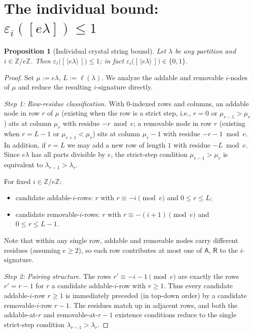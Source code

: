 \documentclass[11pt]{article}
\newtheorem{proposition}[theorem]{Proposition}
\theoremstyle{definition}
\newcommand{\ZZ}{\mathbb{Z}}
\newcommand{\eps}{\varepsilon}
\newcommand{\Aa}{{\mathsf A}}
\newcommand{\Rr}{{\mathsf R}}
\begin{document}
\section{The individual bound: $\eps_i([e\lambda]) \le 1$}\label{sec:individual}

\begin{proposition}[Individual crystal string bound]\label{prop:individual}
Let $\lambda$ be any partition and $i \in \ZZ/e\ZZ$. Then
$\eps_i\bigl([\,|e\lambda\rangle\,]\bigr) \le 1$; in fact
$\eps_i\bigl([\,|e\lambda\rangle\,]\bigr) \in \{0, 1\}$.
\end{proposition}

\begin{proof}
Set $\mu := e\lambda$, $L := \ell(\lambda)$. We analyze the addable and
removable $i$-nodes of $\mu$ and reduce the resulting $i$-signature
directly.

\medskip
\emph{Step 1: Row-residue classification.} With $0$-indexed rows and
columns, an addable node in row $r$ of $\mu$ (existing when the row is a
strict step, i.e., $r = 0$ or $\mu_{r-1} > \mu_r$) sits at column $\mu_r$
with residue $-r \bmod e$; a removable node in row $r$ (existing when
$r = L - 1$ or $\mu_{r+1} < \mu_r$) sits at column $\mu_r - 1$ with residue
$-r - 1 \bmod e$. In addition, if $r = L$ we may add a new row of length
$1$ with residue $-L \bmod e$. Since $e\lambda$ has all parts divisible by
$e$, the strict-step condition $\mu_{r-1} > \mu_r$ is equivalent to
$\lambda_{r-1} > \lambda_r$.

For fixed $i \in \ZZ/e\ZZ$:
\begin{itemize}
  \item candidate addable-$i$-rows: $r$ with $r \equiv -i \pmod e$ and $0 \le r \le L$;
  \item candidate removable-$i$-rows: $r$ with $r \equiv -(i+1) \pmod e$ and $0 \le r \le L - 1$.
\end{itemize}
Note that within any single row, addable and removable nodes carry
different residues (assuming $e \ge 2$), so each row contributes at most
one of $\Aa$, $\Rr$ to the $i$-signature.

\medskip
\emph{Step 2: Pairing structure.} The rows $r' \equiv -i - 1 \pmod e$ are
exactly the rows $r' = r - 1$ for $r$ a candidate addable-$i$-row with
$r \ge 1$. Thus every candidate addable-$i$-row $r \ge 1$ is immediately
preceded (in top-down order) by a candidate removable-$i$-row $r - 1$.
The residues match up in adjacent rows, and both the addable-at-$r$ and
removable-at-$r-1$ existence conditions reduce to the single strict-step
condition $\lambda_{r-1} > \lambda_r$.


\end{proof}
\end{document}
